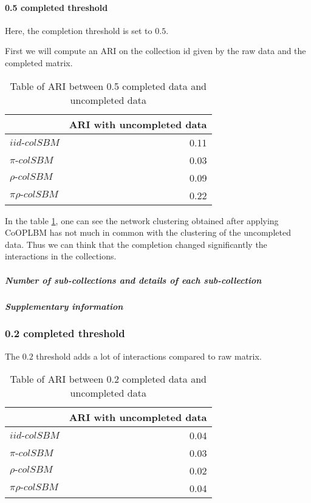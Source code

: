 \hypertarget{completed-threshold}{%
\paragraph{0.5 completed threshold}\label{completed-threshold}}

Here, the completion threshold is set to \(0.5\).

First we will compute an ARI on the collection id given by the raw data
and the completed matrix.

\begin{table}[h!]

\caption{\label{tab:0.5_ARI}\label{tab:ari-table-0-5-completed} Table of ARI between 0.5 completed data and uncompleted data}
\centering
\begin{tabular}[t]{lr}
\toprule
  & ARI with uncompleted data\\
\midrule
$iid\text{-}colSBM$ & 0.11\\
$\pi\text{-}colSBM$ & 0.03\\
$\rho\text{-}colSBM$ & 0.09\\
$\pi\rho\text{-}colSBM$ & 0.22\\
\bottomrule
\end{tabular}
\end{table}

In the table \ref{tab:ari-table-0-5-completed}, one can see the network
clustering obtained after applying CoOPLBM has not much in common with
the clustering of the uncompleted data. Thus we can think that the
completion changed significantly the interactions in the collections.

\hypertarget{number-of-sub-collections-and-details-of-each-sub-collection}{%
\subparagraph{Number of sub-collections and details of each
sub-collection}\label{number-of-sub-collections-and-details-of-each-sub-collection}}

\hypertarget{supplementary-information}{%
\subparagraph{Supplementary
information}\label{supplementary-information}}

\hypertarget{completed-threshold-1}{%
\subsubsection{0.2 completed threshold}\label{completed-threshold-1}}

The \(0.2\) threshold adds a lot of interactions compared to raw matrix.

\begin{table}[h!]

\caption{\label{tab:0.2_ARI}\label{tab:ari-table-0-2-completed} Table of ARI between 0.2 completed data and uncompleted data}
\centering
\begin{tabular}[t]{lr}
\toprule
  & ARI with uncompleted data\\
\midrule
$iid\text{-}colSBM$ & 0.04\\
$\pi\text{-}colSBM$ & 0.03\\
$\rho\text{-}colSBM$ & 0.02\\
$\pi\rho\text{-}colSBM$ & 0.04\\
\bottomrule
\end{tabular}
\end{table}


